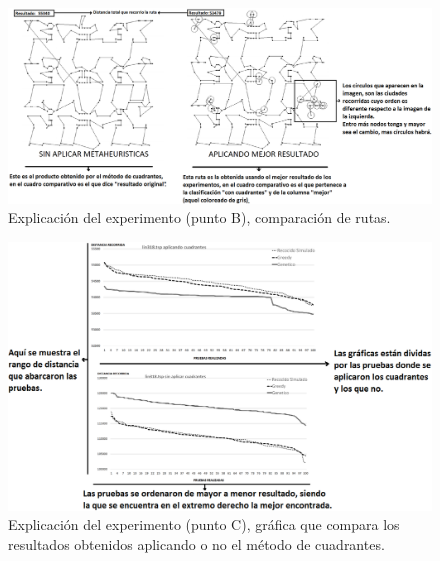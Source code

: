 \begin{figure}[hbtp]
    \centering
        \includegraphics[width=1\textwidth]{PruebasResultados/Imagenes/ExplicacionExperimento_B.png}
        \caption{Explicación del experimento (punto B), comparación de rutas.}
        \label{fig:ExplicacionExperimento_B.png}
\end{figure}

\begin{figure}[hbtp]
    \centering
        \includegraphics[width=1\textwidth]{PruebasResultados/Imagenes/ExplicacionExperimento_C.png}
        \caption{Explicación del experimento (punto C), gráfica que compara los resultados obtenidos aplicando o no el método de cuadrantes.}
        \label{fig:ExplicacionExperimento_C.png}
\end{figure}

\clearpage \newpage
